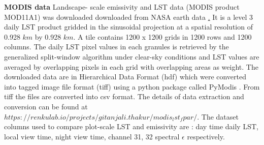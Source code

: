 \documentclass[fleqn,10pt]{wlscirep}
\begin{document}
{\textbf{MODIS data}
 Landscape- scale emissivity and LST data (MODIS product MOD11A1)  was downloaded downloaded from  NASA earth data \href{https://lpdaac.usgs.gov/}. It is a level 3 daily LST product gridded in the sinusoidal projection at a spatial resolution of 0.928 $km$ by 0.928 $km$. A tile contains 1200 x 1200 grids in 1200 rows and 1200 columns\cite{wan2007collection}. The daily LST pixel values in each granules is retrieved by the generalized split-window algorithm under clear-sky conditions and LST values are averaged by overlapping pixels in each grid with overlapping areas as weight. The downloaded data are in Hierarchical Data Format (hdf) which were converted into tagged image file format (tiff) using a python package called PyModis \cite{delucchi2014pymodis}. From tiff the files are converted into csv format. The details of data extraction and conversion can be found at $https://renkulab.io/projects/gitanjali.thakur/modis_lst_fpar/$. The dataset columns used to compare plot-scale LST and emissivity are : day time daily LST, local view time, night view time, channel 31, 32  spectral $\epsilon$ respectively. 
 
}
\end{document}
